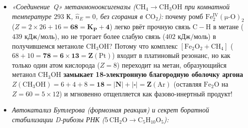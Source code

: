 \begin{enumerate}[label=\textbf{\arabic*.},leftmargin=*]
\begin{itemize}[noitemsep]
    кубановый кластер $\mathrm{Mn_4CaO_5}$ несёт заряд $4\times 25 + 20 + 40 = \mathbf{160 = Q_\square + K_P/2}$, с двумя субстратными молекулами воды $2\,\mathrm{H_2O}$ ($20$) даёт $\mathbf{180 = 12\times 15}$ (ровно $\mu=15$ квантов на каждый из 12 лучей кубооктаэдра!), а с четырьмя молекулами воды $W_1\dots W_4$ даёт $\mathbf{200 = 25\times 8 = d_{\mathrm{out}}(E)^2|{\triangle}|}$. На вспышках $S_1, S_2, S_3$ ($41k = 41, 82, 123 < 128$) оболочка удерживает кислород ($\mathcal{C}_3 > 0$, причём $S_1$ с $\Phi_{\mathrm{gate}}=0$ является тёмно-стабильным состоянием!). Ровно на \textbf{4-й вспышке $S_4$ ($4\times 41 = 164 > 128$)} связь «кластер --- кислород» становится антисвязывающей ($\mathcal{C}_3(164) = -36 < 0$), отталкивая молекулу $\mathrm{O_2}$, тогда как сам оксо-мостик $\mathrm{O5=O6}$ ($\varphi(t=1) = 106$) сохраняет положительную двойную связь $\mathcal{E}_{\mathrm{bond}} = \mathcal{C}_3(106) = \mathbf{+22 > 0}$ и выбрасывается наружу током $\mathcal{J}_{\mathrm{rxn}} = \mathcal{S}_3(106) = \mathbf{+106 > 0}$!
  \item \emph{«Соединение~Q» метанмонооксигеназы ($\mathrm{CH_4 \to CH_3OH}$ при комнатной температуре $293\text{ К}$, $\hat{n}_E = 0$, без сгорания в $\mathrm{CO_2}$):}
    почему ромб $\mathrm{Fe_2^{IV}(\mu\text{-O})_2}$ ($Z = 2\times 26 + 16 = \mathbf{68 = K_P+4}$) легко рвёт прочную связь $\mathrm{C-H}$ в метане ($439\text{ кДж/моль}$), но не трогает более слабую связь ($402\text{ кДж/моль}$) в получившемся метаноле $\mathrm{CH_3OH}$? Потому что комплекс $[\mathrm{Fe_2O_2 + CH_4}]$ ($68 + 10 = \mathbf{78 = 6\times 13 = Z(\mathrm{Pt})}$) входит в платиновый резонанс, но как только один атом кислорода ($Z=8$) переходит на метан, образующийся метанол $\mathrm{CH_3OH}$ \textbf{замыкает 18-электронную благородную оболочку аргона $Z(\mathrm{CH_3OH}) = 6 + 4 + 8 = \mathbf{18 = |N| + |\square| = Z(\mathrm{Ar})}$} (оставляя $\mathrm{Fe_2O}$ на $Z = 60 = 5\times 12$) и мгновенно отщепляется как фазово-инертный продукт!
  \item \emph{Автокатализ Бутлерова (формозная реакция) и секрет боратной стабилизации D-рибозы РНК ($5\,\mathrm{CH_2O}\to\mathrm{C_5H_{10}O_5}$):}

\end{itemize}
\end{enumerate}
